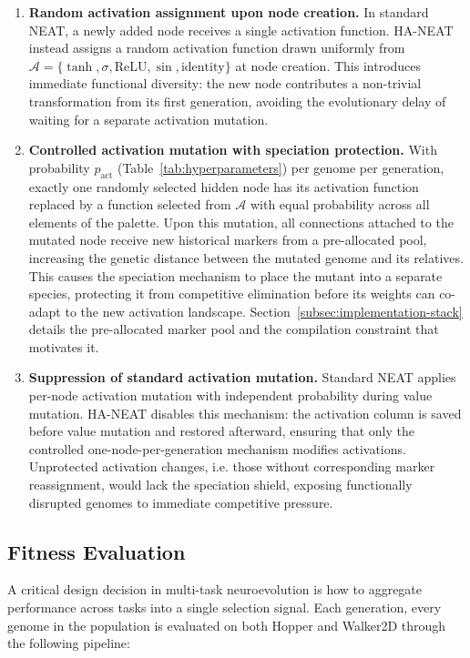 \documentclass[12pt]{article}
\begin{document}
\begin{enumerate}
    \item \textbf{Random activation assignment upon node creation.} In standard NEAT, a newly added node receives a single activation function. HA-NEAT instead assigns a random activation function drawn uniformly from $\mathcal{A} = \{\tanh, \sigma, \text{ReLU}, \sin, \text{identity}\}$ at node creation. This introduces immediate functional diversity: the new node contributes a non-trivial transformation from its first generation, avoiding the evolutionary delay of waiting for a separate activation mutation.
    
    \item \textbf{Controlled activation mutation with speciation protection.} With probability $p_{\text{act}}$ (Table~\ref{tab:hyperparameters}) per genome per generation, exactly one randomly selected hidden node has its activation function replaced by a function selected from
    $\mathcal{A}$ with equal probability across all elements of the palette. Upon this mutation, all connections attached to the mutated node receive new historical markers from a pre-allocated pool, increasing the genetic distance between the mutated genome and its relatives. This causes the speciation mechanism to place the mutant into a separate species, protecting it from competitive elimination before its weights can co-adapt to the new activation landscape. Section~\ref{subsec:implementation-stack} details the pre-allocated marker pool and the compilation constraint that motivates it.
    
    \item \textbf{Suppression of standard activation mutation.} Standard NEAT applies per-node activation mutation with independent probability during value mutation. HA-NEAT disables this mechanism: the activation column is saved before value mutation and restored afterward, ensuring that only the controlled one-node-per-generation mechanism modifies activations. Unprotected activation changes, i.e. those without corresponding marker reassignment, would lack the speciation shield, exposing functionally disrupted genomes to immediate competitive pressure.
\end{enumerate}


\subsection{Fitness Evaluation}
\label{subsec:fitness-evaluation}

A critical design decision in multi-task neuroevolution is how to aggregate performance across tasks into a single selection signal.
Each generation, every genome in the population is evaluated on both Hopper and Walker2D through the following pipeline:
\end{document}
